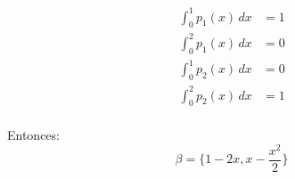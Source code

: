 \begin{enumerate}
    \begin{align*}
        \int_{0}^{1} p_1(x) \, dx &= 1 \\
        \int_{0}^{2} p_1(x) \, dx &= 0 \\
        \int_{0}^{1} p_2(x) \, dx &= 0 \\
        \int_{0}^{2} p_2(x) \, dx &= 1 \\
    \end{align*}

    Entonces:
    \begin{equation*}
        \beta = \{ 1 - 2x, x - \frac{x^{2}}{2}  \}
    \end{equation*}
\end{enumerate}

